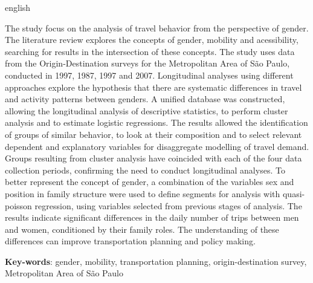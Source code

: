 \documentclass[
  12pt,        %
  openright,      %
  twoside,      %
  a4paper,      %
  english,      %
  brazil        %
]{abntex2}
\begin{document}
\begin{resumo}[Abstract]
 \begin{otherlanguage*}{english}
   
The study focus on the analysis of travel behavior from the perspective of gender. 
The literature review explores the concepts of gender, mobility and acessibility, searching for results in the intersection of these concepts. 
The study uses data from the Origin-Destination surveys for the Metropolitan Area of São Paulo, conducted in 1997, 1987, 1997 and 2007. 
Longitudinal analyses using different approaches explore the hypothesis that there are systematic differences in travel and activity patterns between genders. 
A unified database was constructed, allowing the longitudinal analysis of descriptive statistics, to perform cluster analysis and to estimate logistic regressions. 
The results allowed the identification of groups of similar behavior, to look at their composition and to select relevant dependent and explanatory variables for disaggregate modelling of travel demand. 
Groups resulting from cluster analysis have coincided with each of the four data collection periods, confirming the need to conduct longitudinal analyses. 
To better represent the concept of gender, a combination of the variables sex and position in family structure were used to define segments for analysis with quasi-poisson regression, using variables selected from previous stages of analysis.
The results indicate significant differences in the daily number of trips between men and women, conditioned by their family roles. 
The understanding of these differences can improve transportation planning and policy making.

   \vspace{\onelineskip}

   \noindent
   \textbf{Key-words}: gender, mobility, transportation planning, origin-destination survey, Metropolitan Area of São Paulo
 \end{otherlanguage*}
\end{resumo}

%

%
\end{document}
